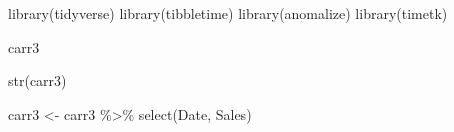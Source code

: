 \documentclass[
]{article}
\newenvironment{Shaded}{\begin{snugshade}}{\end{snugshade}}
\newcommand{\AttributeTok}[1]{\textcolor[rgb]{0.77,0.63,0.00}{#1}}
\newcommand{\FunctionTok}[1]{\textcolor[rgb]{0.00,0.00,0.00}{#1}}
\newcommand{\NormalTok}[1]{#1}
\newcommand{\OtherTok}[1]{\textcolor[rgb]{0.56,0.35,0.01}{#1}}
\newcommand{\SpecialCharTok}[1]{\textcolor[rgb]{0.00,0.00,0.00}{#1}}
\newcommand{\StringTok}[1]{\textcolor[rgb]{0.31,0.60,0.02}{#1}}
\begin{document}
\begin{Shaded}
\begin{Highlighting}[]
\FunctionTok{library}\NormalTok{(tidyverse)}
\FunctionTok{library}\NormalTok{(tibbletime)}
\FunctionTok{library}\NormalTok{(anomalize)}
\FunctionTok{library}\NormalTok{(timetk)}
\end{Highlighting}
\end{Shaded}

\begin{Shaded}
\begin{Highlighting}[]
\NormalTok{carr3}
\end{Highlighting}
\end{Shaded}

\begin{Shaded}
\begin{Highlighting}[]
\FunctionTok{str}\NormalTok{(carr3)}
\end{Highlighting}
\end{Shaded}

\begin{Shaded}
\end{Shaded}

\begin{Shaded}
\end{Shaded}

\begin{Shaded}
\begin{Highlighting}[]
\NormalTok{carr3 }\OtherTok{\textless{}{-}}\NormalTok{ carr3 }\SpecialCharTok{\%\textgreater{}\%} \FunctionTok{select}\NormalTok{(Date, Sales)}
\end{Highlighting}
\end{Shaded}
\end{document}
